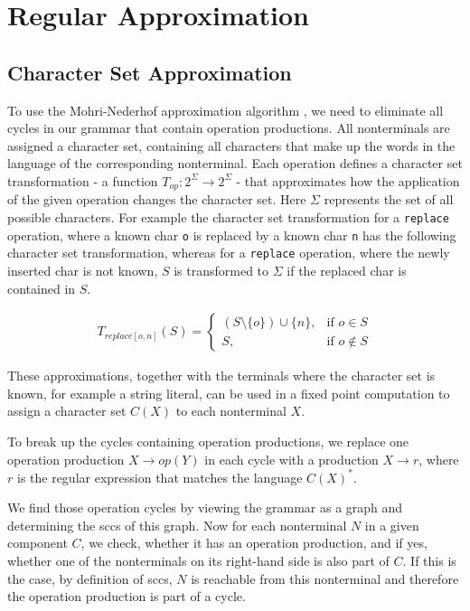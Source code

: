 \section{Regular Approximation}\label{approximation}
\subsection{Character Set Approximation}\label{charsetApprox}
To use the Mohri-Nederhof approximation algorithm \cite{mohri_nederhof}, we need to eliminate all cycles in our grammar that contain operation productions.
All nonterminals are assigned a character set, containing all characters that make up the words in the language of the corresponding nonterminal. Each operation defines a character set transformation - a function $T_{op} : 2^\Sigma \rightarrow 2^\Sigma$ - that approximates how the application of the given operation changes the character set. Here $\Sigma$ represents the set of all possible characters.
For example the character set transformation for a \lstinline|replace| operation, where a known char \lstinline|o| is replaced by a known char \lstinline|n| has the following character set transformation, whereas for a \lstinline|replace| operation, where the newly inserted char is not known, $S$ is transformed to $\Sigma$ if the replaced char is contained in $S$.

\begin{align}
	T_{replace[o, n]}(S) = 
	\begin{cases}
		(S \setminus \{o\}) \cup \{n\}, & \text{if } o \in S\\
		S, & \text{if } o \notin S
	\end{cases}
\end{align}


These approximations, together with the terminals where the character set is known, for example a string literal, can be used in a fixed point computation to assign a character set $C(X)$ to each nonterminal $X$.

To break up the cycles containing operation productions, we replace one operation production $X \rightarrow op(Y)$ in each cycle with a production $X \rightarrow r$, where $r$ is the regular expression that matches the language $C(X)^*$.

We find those operation cycles by viewing the grammar as a graph and determining the \acp{scc} of this graph. Now for each nonterminal $N$ in a given component $C$, we check, whether it has an operation production, and if yes, whether one of the nonterminals on its right-hand side is also part of $C$. If this is the case, by definition of \acp{scc}, $N$ is reachable from this nonterminal and therefore the operation production is part of a cycle.

